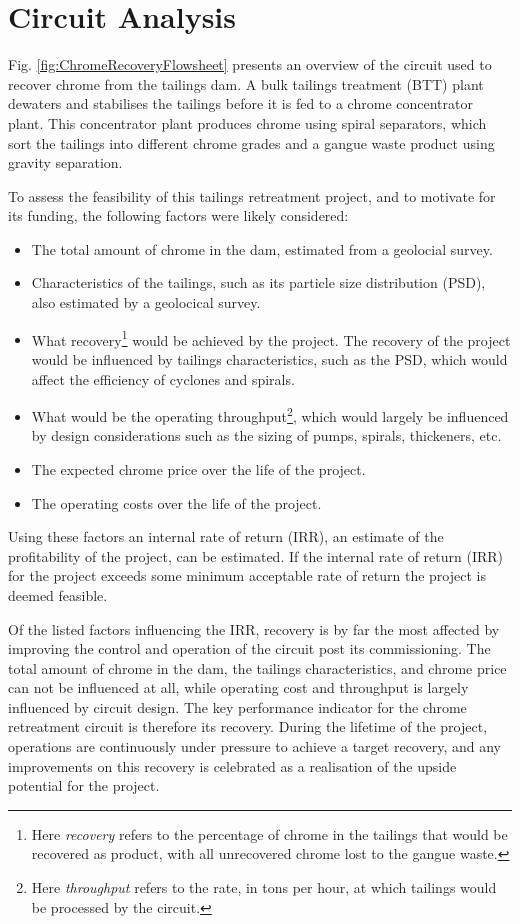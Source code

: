 \documentclass[preprint,authoryear,12pt]{elsarticle}
\begin{document}
\section{Circuit Analysis}\label{sec:CircuitAnalysis}
Fig. \ref{fig:ChromeRecoveryFlowsheet} presents an overview of the circuit used to recover chrome from the tailings dam. A bulk tailings treatment (BTT) plant dewaters and stabilises the tailings before it is fed to a chrome concentrator plant. This concentrator plant produces chrome using spiral separators, which sort the tailings into different chrome grades and a gangue waste product using gravity separation. 
 
To assess the feasibility of this tailings retreatment project, and to motivate for its funding, the following factors were likely considered:
\begin{itemize}
	\item The total amount of chrome in the dam, estimated from a geolocial survey.
	\item Characteristics of the tailings, such as its particle size distribution (PSD), also estimated by a geolocical survey.
	\item What recovery\footnote{Here \emph{recovery} refers to the percentage of chrome in the tailings that would be recovered as product, with all unrecovered chrome lost to the gangue waste.} would be achieved by the project. The recovery of the project would be influenced by tailings characteristics, such as the PSD, which would affect the efficiency of cyclones and spirals. 
	\item What would be the operating throughput\footnote{Here \emph{throughput} refers to the rate, in tons per hour, at which tailings would be processed by the circuit.}, which would largely be influenced by design considerations such as the sizing of pumps, spirals, thickeners, etc.
	\item The expected chrome price over the life of the project.
	\item The operating costs over the life of the project.
\end{itemize} 

Using these factors an internal rate of return (IRR), an estimate of the profitability of the project, can be estimated.  If the internal rate of return (IRR) for the project exceeds some minimum acceptable rate of return the project is deemed feasible.

Of the listed factors influencing the IRR, recovery is by far the most affected by improving the control and operation of the circuit post its commissioning. The total amount of chrome in the dam, the tailings characteristics, and chrome price can not be influenced at all, while operating cost and throughput is largely influenced by circuit design. The key performance indicator for the chrome retreatment circuit is therefore its recovery. During the lifetime of the project, operations are continuously under pressure to achieve a target recovery, and any improvements on this recovery is celebrated as a realisation of the upside potential for the project.
\end{document}
